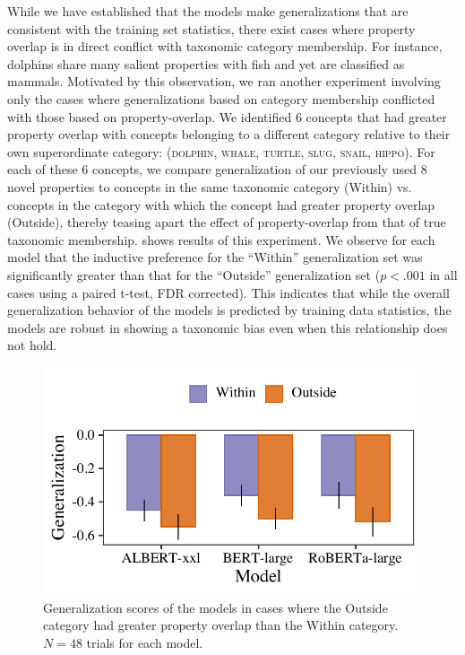 \documentclass[10pt,letterpaper]{article}
\begin{document}
While we have established that the models make generalizations that are consistent with the training set statistics, there exist cases where property overlap is in direct conflict with taxonomic category membership. For instance, dolphins share many salient properties with fish and yet are classified as mammals. 
Motivated by this observation, we ran another experiment involving only the cases where generalizations based on category membership conflicted with those based on property-overlap. We identified 6 concepts 
that had greater property overlap with concepts belonging to a different category relative to their own superordinate category: (\textsc{dolphin, whale, turtle, slug, snail, hippo}). 
For each of these 6 concepts, we compare generalization of our previously used 8 novel properties to concepts in the same taxonomic category (Within) vs. concepts in the category with which the concept had greater property overlap (Outside), thereby teasing apart the effect of property-overlap from that of true taxonomic membership.
 shows results of this experiment. We observe for each model that the inductive preference for the ``Within'' generalization set was significantly greater than that for the ``Outside'' generalization set ($p < .001$ in all cases using a paired t-test, FDR corrected). 
This indicates that while the overall generalization behavior of the models is predicted by training data statistics, the models are robust in showing a taxonomic bias even when this relationship does not hold.
\begin{figure}[t!]
    \centering
    \includegraphics[width=0.8\columnwidth]{teaseapart.pdf}
    \vspace{-1em}
    \caption{Generalization scores of the models in cases where the Outside category had greater property overlap than the Within category. $N = 48$ trials for each model.}
    \label{fig:teaseapart}
    \vspace{-1.5em}
\end{figure}
\end{document}
